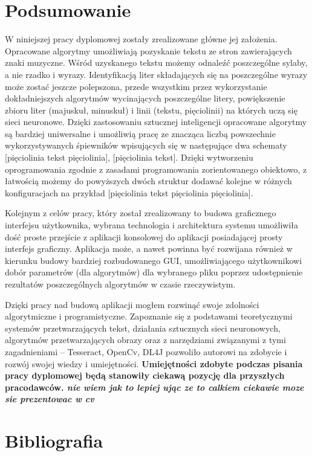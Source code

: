 \documentclass[a4paper,12pt]{article}
\newcommand\spacingIndent{2.2em}
\begin{document}
	   \newpage  
	   \section{Podsumowanie}
	   \hspace{\spacingIndent} W niniejszej pracy dyplomowej zostały zrealizowane główne jej założenia. Opracowane algorytmy umożliwiają pozyskanie tekstu ze stron zawierających znaki muzyczne. Wśród uzyskanego tekstu możemy odnaleźć poszczególne sylaby, a nie rzadko i wyrazy. Identyfikacją liter składających się na poszczególne wyrazy może zostać jeszcze polepszona, przede wszystkim przez wykorzystanie dokładniejszych algorytmów wycinających poszczególne litery, powiększenie zbioru liter (majuskuł, minuskuł) i linii (tekstu, pięciolinii) na których uczą się sieci neuronowe. Dzięki zastosowaniu sztucznej inteligencji opracowane algorytmy są bardziej uniwersalne i umożliwią pracę ze znacząca liczbą powszechnie wykorzystywanych śpiewników wpisujących się w następujące dwa schematy [pięciolinia tekst pięciolinia], [pięciolinia tekst]. Dzięki wytworzeniu oprogramowania zgodnie z zasadami programowania zorientowanego obiektowo, z łatwością możemy do powyższych dwóch struktur dodawać kolejne w różnych konfiguracjach na przykład [pięciolinia tekst pięciolinia pięciolinia].
	   
	   Kolejnym z celów pracy, który został zrealizowany to budowa graficznego interfejsu użytkownika, wybrana technologia i architektura systemu umożliwiła dość proste przejście z aplikacji konsolowej do aplikacji posiadającej prosty interfejs graficzny. Aplikacja może, a nawet powinna być rozwijana również w kierunku budowy bardziej rozbudowanego GUI, umożliwiającego użytkownikowi dobór parametrów (dla algorytmów) dla wybranego pliku poprzez udostępnienie rezultatów poszczególnych algorytmów w czasie rzeczywistym.
	   
	   Dzięki pracy nad budową aplikacji mogłem rozwinąć swoje zdolności algorytmiczne i programistyczne. Zapoznanie się z podstawami teoretycznymi systemów przetwarzających tekst, działania sztucznych sieci neuronowych, algorytmów przetwarzających obrazy oraz z narzędziami związanymi z tymi zagadnieniami -- Tesseract, OpenCv, DL4J pozwoliło autorowi na zdobycie i rozwój swojej wiedzy i umiejętności. \textbf{Umiejętności zdobyte podczas pisania pracy dyplomowej będą stanowiły ciekawą pozycję dla przyszłych pracodawców. \textit{nie wiem jak to lepiej ując ze to calkiem ciekawie moze sie prezentowac w cv}}
	   
	   \newpage
	   \section{Bibliografia}
\end{document}
